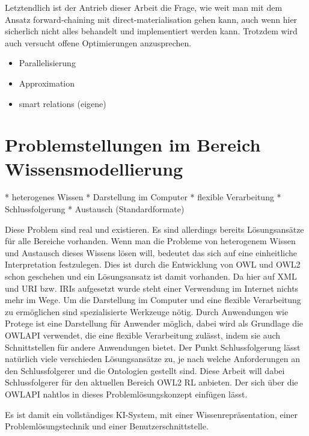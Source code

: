 Letztendlich ist der Antrieb dieser Arbeit die Frage, wie weit man mit dem Ansatz forward-chaining mit direct-materialisation gehen kann, auch wenn hier sicherlich nicht alles behandelt und implementiert werden kann. Trotzdem wird auch versucht offene Optimierungen anzusprechen.

\begin{itemize}
  \item Parallelisierung
  \item Approximation
  \item smart relations (eigene)
\end{itemize}

\section{Problemstellungen im Bereich Wissensmodellierung}
 * heterogenes Wissen
 * Darstellung im Computer
 * flexible Verarbeitung
 * Schlussfolgerung
 * Austausch (Standardformate)

Diese Problem sind real und existieren. Es sind allerdings bereits Lösungsansätze für alle Bereiche vorhanden. Wenn man die Probleme von heterogenem Wissen und Austausch dieses Wissens lösen will, bedeutet das sich auf eine einheitliche Interpretation festzulegen. Dies ist durch die Entwicklung von OWL und OWL2 schon geschehen und ein Lösungsansatz ist damit vorhanden. Da hier auf XML und URI bzw. IRIs aufgesetzt wurde steht einer Verwendung im Internet nichts mehr im Wege. Um die Darstellung im Computer und eine flexible Verarbeitung zu ermöglichen sind spezialisierte Werkzeuge nötig. Durch Anwendungen wie Protege ist eine Darstellung für Anwender möglich, dabei wird als Grundlage die OWLAPI verwendet, die eine flexible Verarbeitung zulässt, indem sie auch Schnittstellen für andere Anwendungen bietet. Der Punkt Schlussfolgerung lässt natürlich viele verschieden Lösungsansätze zu, je nach welche Anforderungen an den Schlussfolgerer und die Ontologien gestellt sind. Diese Arbeit will dabei Schlussfolgerer für den aktuellen Bereich OWL2 RL anbieten. Der sich über die OWLAPI nahtlos in dieses Problemlösungskonzept einfügen lässt.

Es ist damit ein vollständiges KI-System, mit einer Wissenrepräsentation, einer Problemlösungstechnik und einer Benutzerschnittstelle.

